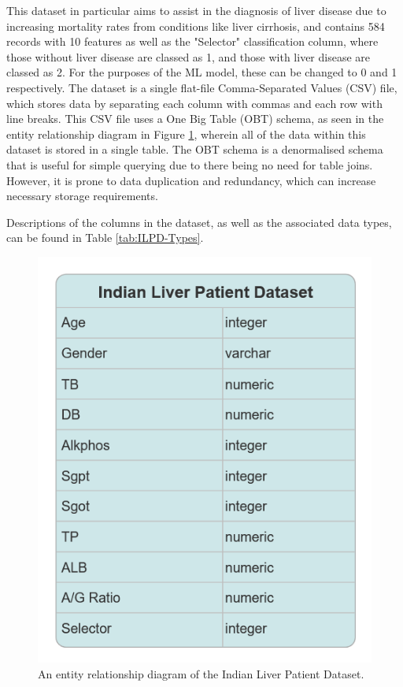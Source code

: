 \documentclass[12pt]{report}
\begin{document}
This dataset in particular aims to assist in the diagnosis of liver
disease due to increasing mortality rates from conditions like liver cirrhosis, and contains 584 records with 10 features
as well as the "Selector" classification column, where those without liver disease are classed as 1, and those with liver disease 
are classed as 2. For the purposes of the ML model, these can be changed to 0 and 1 respectively. 
The dataset is a single flat-file Comma-Separated Values (CSV) file, which stores data by separating each column with commas
and each row with line breaks. This CSV file uses a One Big Table (OBT) schema, as seen in the entity relationship diagram 
in Figure \ref{fig:ILPD-ERD}, wherein all of the data within this dataset is stored in a single table. 
The OBT schema is a denormalised schema that is useful for simple querying due to there being no need for table joins. 
However, it is prone to data duplication and redundancy, which can increase necessary storage requirements.

Descriptions of the columns in the dataset, as well as the associated data types, can be found in Table \ref{tab:ILPD-Types}.

\begin{figure}[H]
    \centering
    \includegraphics[width=.75\linewidth]{ILPD-ERD.png}
    \caption{An entity relationship diagram of the Indian Liver Patient Dataset.}
    \label{fig:ILPD-ERD}
\end{figure}
\end{document}
